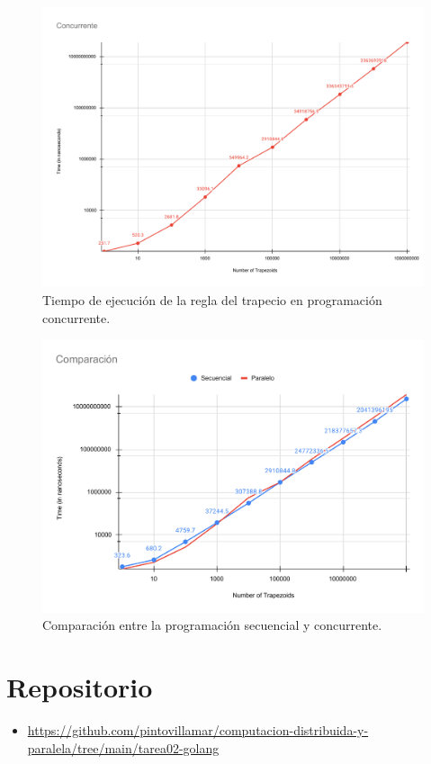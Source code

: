 \documentclass[a4paper]{article}
\begin{document}
\begin{figure}[H]
\centering
\includegraphics[width=\textwidth]{Concurrente.pdf}
\caption{Tiempo de ejecución de la regla del trapecio en programación concurrente.}
\end{figure}

\begin{figure}[H]
\centering
\includegraphics[width=\textwidth]{Comparacion.pdf}
\caption{Comparación entre la programación secuencial y concurrente.}
\end{figure}


\section{Repositorio}
\begin{itemize}
\item \href{https://github.com/pintovillamar/computacion-distribuida-y-paralela/tree/main/tarea02-golang}{https://github.com/pintovillamar/computacion-distribuida-y-paralela/tree/main/tarea02-golang}
\end{itemize}




\end{document}
